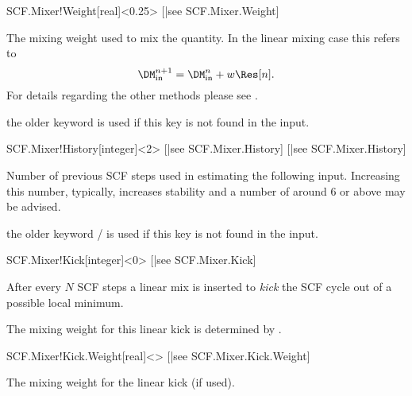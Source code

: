 \begin{fdfentry}{SCF.Mixer!Weight}[real]<0.25>%
  [|see SCF.Mixer.Weight]

  The mixing weight used to mix the quantity.
  In the linear mixing case this refers to
  \begin{equation}
    \DM^{n+1}_{\mathrm{in}} = \DM^n_{\mathrm{in}} + w \Res[n].
  \end{equation}
  For details regarding the other methods please see
  .

  \note the older keyword  is used if this key is
  not found in the input.

\end{fdfentry}


\begin{fdfentry}{SCF.Mixer!History}[integer]<2>%
  [|see SCF.Mixer.History]%
  [|see SCF.Mixer.History]

  Number of previous SCF steps used in estimating the following input.
  Increasing this number, typically, increases stability and a number
  of around 6 or above may be advised.

  \note the older keyword /
  is used if this key is not found in the input.

\end{fdfentry}


\begin{fdfentry}{SCF.Mixer!Kick}[integer]<0>%
  [|see SCF.Mixer.Kick]

  After every $N$ SCF steps a linear mix is inserted to \emph{kick}
  the SCF cycle out of a possible local minimum. 

  The mixing weight for this linear kick is determined by .
  
\end{fdfentry}

\begin{fdfentry}{SCF.Mixer!Kick.Weight}[real]<>%
  [|see SCF.Mixer.Kick.Weight]

  The mixing weight for the linear kick (if used).
  
\end{fdfentry}



